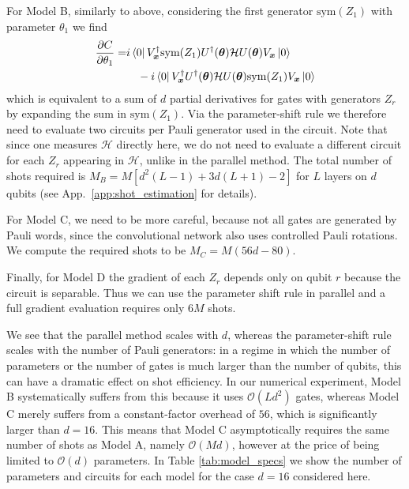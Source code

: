 \documentclass[twocolumn]{revtex4-2}
\renewcommand{\vec}{\boldsymbol}
\begin{document}
For Model B, similarly to above, considering the first generator $\text{sym}(Z_1)$ with parameter $\theta_1$ we find
%
\begin{align}
    \frac{\partial C}{\partial \theta_1} =& i\bra{0}V_{\vec{x}}^\dagger \text{sym}(Z_1)U^\dagger(\vec{\theta})\mathcal{H}U(\vec{\theta})V_{\vec{x}}\ket{0} \nonumber\\ &\quad- i\bra{0}V_{\vec{x}}^\dagger U^\dagger(\vec{\theta})\mathcal{H}U(\vec{\theta})\text{sym}(Z_1)V_{\vec{x}}\ket{0} 
\end{align}
%
which is equivalent to a sum of $d$ partial derivatives for gates with generators $Z_r$ by expanding the sum in $\text{sym}(Z_1)$. Via the parameter-shift rule we therefore need to evaluate two circuits per Pauli generator used in the circuit.
Note that since one measures $\mathcal{H}$ directly here, we do not need to evaluate a different circuit for each $Z_r$ appearing in $\mathcal{H}$, unlike in the parallel method. The total number of shots required is $M_B=M\left[d^2(L-1)+3d(L+1)-2\right]$ for $L$ layers on $d$ qubits (see App.\ \ref{app:shot_estimation} for details).

For Model C, we need to be more careful, because not all gates are generated by Pauli words, since the convolutional network also uses controlled Pauli rotations. We compute the required shots to be $M_C = M(56d-80)$.

Finally, for Model D the gradient of each $Z_r$ depends only on qubit $r$ because the circuit is separable. Thus we can use the parameter shift rule in parallel and a full gradient evaluation requires only $6M$ shots.

We see that the parallel method scales with $d$, whereas the parameter-shift rule scales with the number of Pauli generators: in a regime in which the number of parameters or the number of gates is much larger than the number of qubits, this can have a dramatic effect on shot efficiency. In our numerical experiment, Model B systematically suffers from this because it uses $\mathcal{O}(Ld^2)$ gates, whereas Model C merely suffers from a constant-factor overhead of $56$, which is significantly larger than $d=16$.
This means that Model C asymptotically requires the same number of shots as Model A, namely $\mathcal{O}(Md)$, however at the price of being limited to $\mathcal{O}(d)$ parameters. In Table \ref{tab:model_specs} we show the number of parameters and circuits for each model for the case $d=16$ considered here. 
\end{document}
